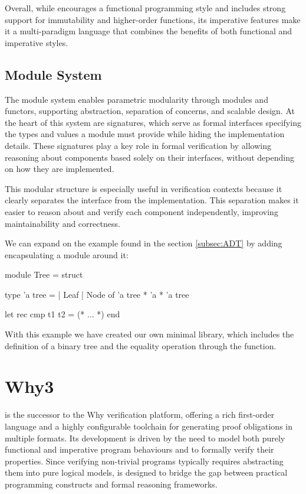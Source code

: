 Overall, while \ocaml encourages a functional programming style and includes strong support for immutability and higher-order functions, 
its imperative features make it a multi-paradigm language that combines the benefits of both functional and imperative styles.

\subsection{Module System}

The module system enables parametric modularity through modules and functors, supporting abstraction, separation of concerns, and 
scalable design. At the heart of this system are signatures, which serve as formal interfaces specifying the types and values a 
module must provide while hiding the implementation details. These signatures play a key role in formal verification by allowing 
reasoning about components based solely on their interfaces, without depending on how they are implemented.

This modular structure is especially useful in verification contexts because it clearly separates the interface from the 
implementation. This separation makes it easier to reason about and verify each component independently, improving 
maintainability and correctness.

We can expand on the example found in the section \ref{subsec:ADT} by adding encapsulating a module around it:

\begin{ocamlenv}
module Tree = struct

  type 'a tree =
    | Leaf
    | Node of 'a tree * 'a * 'a tree

  let rec cmp t1 t2 = (* ... *)
end
\end{ocamlenv}

With this example we have created our own minimal  library, which includes the definition of a binary tree and the equality 
operation through the  function.

\section{Why3}
\label{sec:Why3}

\whythree is the successor to the Why verification platform, offering a rich first-order language and a highly configurable 
toolchain for generating proof obligations in multiple formats. Its development is driven by the need to model both purely 
functional and imperative program behaviours and to formally verify their properties. Since verifying non-trivial programs 
typically requires abstracting them into pure logical models, \whythree is designed to bridge the gap between practical programming 
constructs and formal reasoning frameworks.

